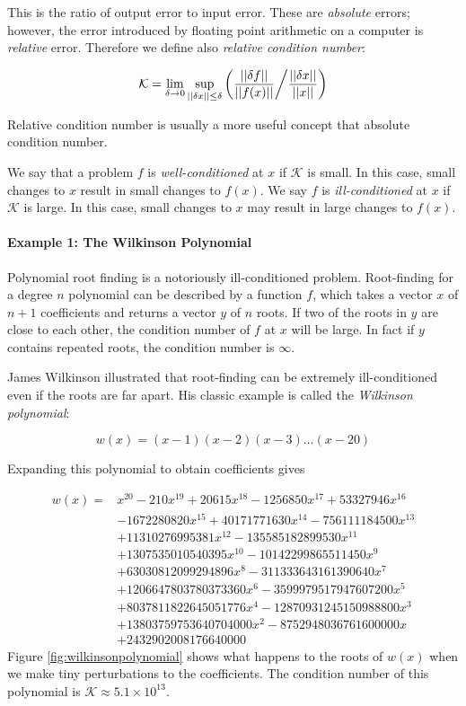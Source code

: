 This is the ratio of output error to input error. These are \emph{absolute} errors; however, the error introduced by floating point arithmetic on a computer is \emph{relative} error. Therefore we define also \emph{relative condition number}:

\begin{equation}
\mathcal{K} = \lim_{\delta \rightarrow 0} \sup_{||\delta x|| \leq \delta} \left({ \frac{|| \delta f||}{||f(x)||} } \middle/ { \frac{|| \delta x||}{||x||} }\right)
\label{def:relativeconditionnumber}
\end{equation}

Relative condition number is usually a more useful concept that absolute condition number.

We say that a problem $f$ is \emph{well-conditioned} at $x$ if $\mathcal{K}$ is small. In this case, small changes to $x$ result in small changes to $f(x)$. We say $f$ is \emph{ill-conditioned} at $x$ if $\mathcal{K}$ is large. In this case, small changes to $x$ may result in large changes to $f(x)$. 

\paragraph{Example 1: The Wilkinson Polynomial}
Polynomial root finding is a notoriously ill-conditioned problem. Root-finding for a degree $n$ polynomial can be described by a function $f$, which takes a vector $x$ of $n+1$ coefficients and returns a vector $y$ of $n$ roots. If two of the roots in $y$ are close to each other, the condition number of $f$ at $x$ will be large. In fact if $y$ contains repeated roots, the condition number is $\infty$.
 
 James Wilkinson illustrated that root-finding can be extremely ill-conditioned even if the roots are far apart. His classic example is called the \emph{Wilkinson polynomial}:
 
 \[
 w(x) = (x-1)(x-2)(x-3)\hdots(x-20)
 \]
 
 Expanding this polynomial to obtain coefficients gives
 
 \[\begin{array}{cl}
 w(x)=& x^{20}-210x^{19} +20615x^{18} -1256850 x^{17} +53327946 x^{16}\\ 
 &-1672280820x^{15} + 40171771630x^{14} -756111184500x^{13}\\
&+11310276995381 x^{12} -135585182899530 x^{11}\\ 
&+1307535010540395 x^{10} -10142299865511450 x^9\\
&+63030812099294896 x^8 -311333643161390640 x^7\\ 
&+1206647803780373360 x^6 -3599979517947607200 x^5\\ 
&+8037811822645051776 x^4 -12870931245150988800 x^3\\
& +13803759753640704000 x^2 -8752948036761600000 x\\
& +2432902008176640000
      \end{array} \]
Figure \ref{fig:wilkinsonpolynomial} shows what happens to the roots of $w(x)$ when we make tiny perturbations to the coefficients. The condition number of this polynomial is $\mathcal{K} \approx 5.1 \times 10^{13}$.

